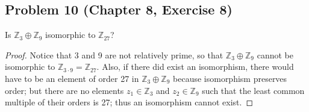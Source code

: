 \documentclass{article}
\begin{document}
\subsection*{Problem 10 (Chapter 8, Exercise 8)}
Is $\mathbb{Z}_3 \oplus \mathbb{Z}_9$ isomorphic to $\mathbb{Z}_{27}$?
\begin{proof}
Notice that 3 and 9 are not relatively prime, so that $\mathbb{Z}_3 \oplus \mathbb{Z}_9$ cannot be isomorphic to $\mathbb{Z}_{3 \cdot 9} = \mathbb{Z}_{27}$. Also, if there did exist an isomorphism, there would have to be an element of order 27 in $\mathbb{Z}_3 \oplus \mathbb{Z}_9$ because isomorphism preserves order; but there are no elements $z_1 \in \mathbb{Z}_3$ and $z_2 \in \mathbb{Z}_9$ such that the least common multiple of their orders is 27; thus an isomorphism cannot exist.
\end{proof}
\end{document}
